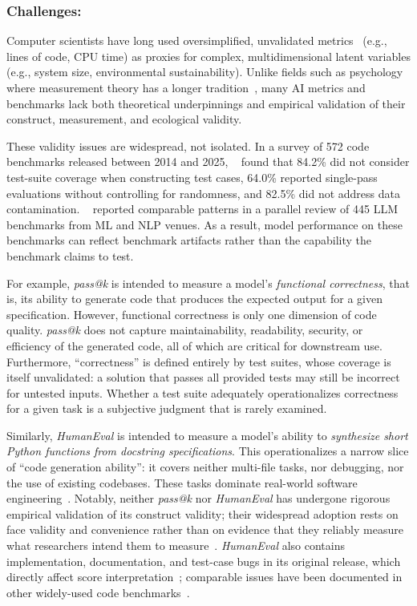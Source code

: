 \documentclass[smallextended]{svjour3}
\newcommand{\guidelinesubsubsection}[1]{\subsubsection{\bfseries #1:}}
\newcommand{\guidelinesubsubsection}[1]{\subsubsection{#1}}
\begin{document}
\guidelinesubsubsection{Challenges}

Computer scientists have long used oversimplified, unvalidated metrics~\cite{DBLP:conf/ease/RalphT18} (e.g., lines of code, CPU time) as proxies for complex, multidimensional latent variables (e.g., system size, environmental sustainability). Unlike fields such as psychology where measurement theory has a longer tradition~\cite{borsboom2005measuring}, many AI metrics and benchmarks lack both theoretical underpinnings and empirical validation of their construct, measurement, and ecological validity.

These validity issues are widespread, not isolated. In a survey of 572 code benchmarks released between 2014 and 2025, \citeauthor{cao2025should}~\cite{cao2025should} found that 84.2\% did not consider test-suite coverage when constructing test cases, 64.0\% reported single-pass evaluations without controlling for randomness, and 82.5\% did not address data contamination. \citeauthor{bean2025measuring}~\cite{bean2025measuring} reported comparable patterns in a parallel review of 445 LLM benchmarks from ML and NLP venues. As a result, model performance on these benchmarks can reflect benchmark artifacts rather than the capability the benchmark claims to test.

For example, \emph{pass@k} is intended to measure a model's \textit{functional correctness}, that is, its ability to generate code that produces the expected output for a given specification. However, functional correctness is only one dimension of code quality. \emph{pass@k} does not capture maintainability, readability, security, or efficiency of the generated code, all of which are critical for downstream use. Furthermore, ``correctness'' is defined entirely by test suites, whose coverage is itself unvalidated: a solution that passes all provided tests may still be incorrect for untested inputs. Whether a test suite adequately operationalizes correctness for a given task is a subjective judgment that is rarely examined.

Similarly, \emph{HumanEval} is intended to measure a model's ability to \textit{synthesize short Python functions from docstring specifications}. This operationalizes a narrow slice of ``code generation ability'': it covers neither multi-file tasks, nor debugging, nor the use of existing codebases. These tasks dominate real-world software engineering~\cite{Chandra2025benchmarks, yang2025code}. Notably, neither \emph{pass@k} nor \emph{HumanEval} has undergone rigorous empirical validation of its construct validity; their widespread adoption rests on face validity and convenience rather than on evidence that they reliably measure what researchers intend them to measure~\cite{cao2025should}. \emph{HumanEval} also contains implementation, documentation, and test-case bugs in its original release, which directly affect score interpretation~\cite{DBLP:conf/nips/LiuXW023}; comparable issues have been documented in other widely-used code benchmarks~\cite{cao2025should}.
\end{document}

